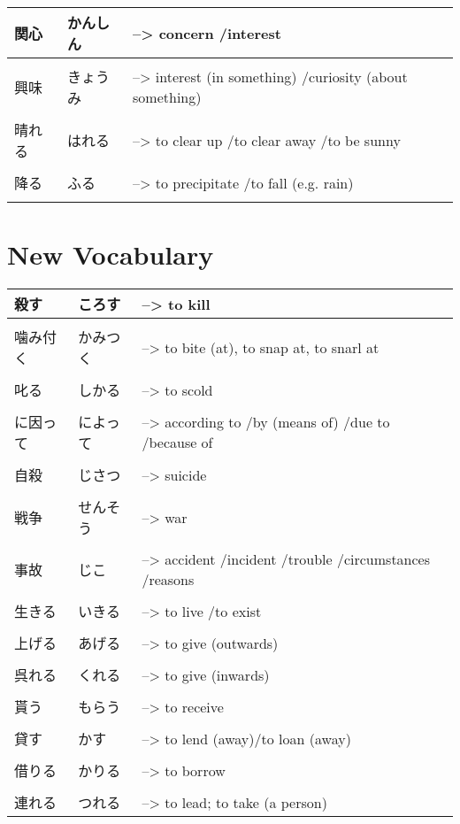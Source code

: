 \documentclass{article}
\begin{document}
\begin{tabular}{ p{3cm} | l l }
関心&かんしん&--> concern /interest \\ \hline\\[-1em]
興味&きょうみ&--> interest (in something) /curiosity (about something) \\ \hline\\[-1em]
晴れる&はれる&--> to clear up /to clear away /to be sunny \\ \hline\\[-1em]
降る&ふる&--> to precipitate /to fall (e.g. rain) \\ \hline\\[-1em]
\end{tabular}
\part*{New Vocabulary}
\begin{tabular}{ p{3cm} | l l }
殺す&ころす&--> to kill \\ \hline\\[-1em]
噛み付く&かみつく&--> to bite (at), to snap at, to snarl at \\ \hline\\[-1em]
叱る&しかる&--> to scold \\ \hline\\[-1em]
に因って&によって&--> according to /by (means of) /due to /because of \\ \hline\\[-1em]
自殺&じさつ&--> suicide \\ \hline\\[-1em]
戦争&せんそう&--> war \\ \hline\\[-1em]
事故&じこ&--> accident /incident /trouble /circumstances /reasons \\ \hline\\[-1em]
生きる&いきる&--> to live /to exist \\ \hline\\[-1em]
上げる&あげる&--> to give (outwards) \\ \hline\\[-1em]
呉れる&くれる&--> to give (inwards) \\ \hline\\[-1em]
貰う&もらう&--> to receive \\ \hline\\[-1em]
貸す&かす&--> to lend (away)/to loan (away) \\ \hline\\[-1em]
借りる&かりる&--> to borrow \\ \hline\\[-1em]
連れる&つれる&--> to lead; to take (a person) %
\end{tabular}
\end{document}
